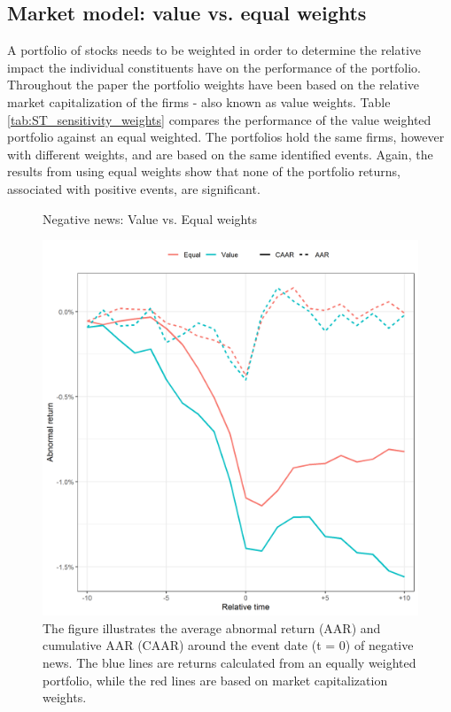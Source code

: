 \subsection{Market model: value vs. equal weights}

A portfolio of stocks needs to be weighted in order to determine the relative impact the individual constituents have on the performance of the portfolio. Throughout the paper the portfolio weights have been based on the relative market capitalization of the firms - also known as value weights. Table \ref{tab:ST_sensitivity_weights} compares the performance of the value weighted portfolio against an equal weighted. The portfolios hold the same firms, however with different weights, and are based on the same identified events. Again, the results from using equal weights show that none of the portfolio returns, associated with positive events, are significant. 

\begin{figure}[H]
    \centering
    \caption{Negative news: Value vs. Equal weights}
    \includegraphics[scale=0.6]{Projekt/1.Figures analysis/ST_negative_sensitivity_weight.png}
     \caption*{\footnotesize The figure illustrates the average abnormal return (AAR) and cumulative AAR (CAAR) around the event date (t = 0) of negative news. The blue lines are returns calculated from an equally weighted portfolio, while the red lines are based on market capitalization weights.}
    \label{fig:ST_neg_sensitivity_weight}
\end{figure} 


